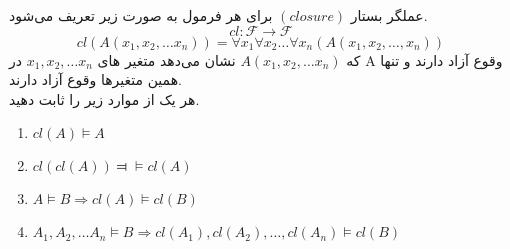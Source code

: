 
	عملگر بستار 
	$(closure)$
	برای هر فرمول به صورت زیر تعریف ‌می‌شود. 
	$$cl : \mathcal{F} \longrightarrow \mathcal{F}$$
	$$
		cl(A(x_1, x_2, \dots x_n)) = \forall x_1 \forall x_2 \dots \forall x_n(A(x_1, x_2, \dots, x_n))
	$$
	که
	$A(x_1, x_2, \dots x_n)$
	نشان می‌دهد متغیر های 
	$x_1, x_2, \dots x_n$
	در A وقوع آزاد دارند و تنها همین متغیر‌ها وقوع آزاد دارند.\\
	هر یک از موارد زیر را ثابت دهید.
	\begin{enumerate}[label = (\alph*]
		\LTR
		\item $cl(A) \vDash A$
		\item $cl(cl(A)) \Dashv\vDash cl(A)$
		\item $A \vDash B \Longrightarrow cl(A) \vDash cl(B)$
		\item $A_1, A_2, \dots A_n \vDash B \Longrightarrow cl(A_1), cl(A_2), \dots, cl(A_n) \vDash cl(B)$
	\end{enumerate}
